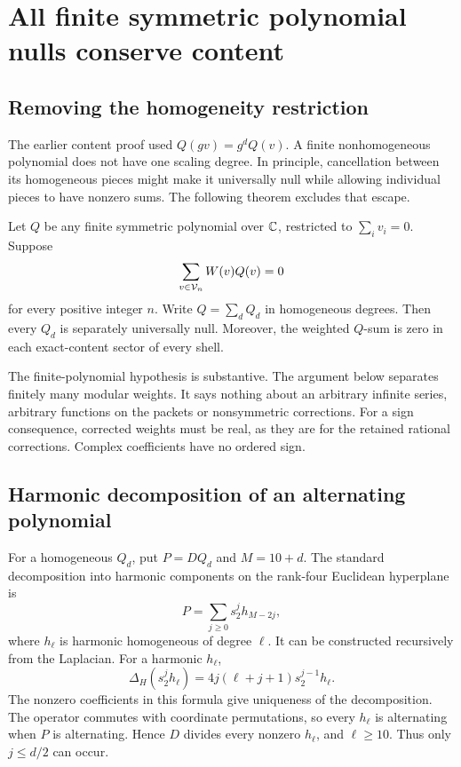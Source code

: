 \chapter{All finite symmetric polynomial nulls conserve content}\label{ch:pcall}
\section{Removing the homogeneity restriction}
The earlier content proof used $Q(gv)=g^dQ(v)$. A finite nonhomogeneous polynomial does not have one scaling degree. In principle, cancellation between its homogeneous pieces might make it universally null while allowing individual pieces to have nonzero sums. The following theorem excludes that escape.

\begin{theorem}\label{thm:pcall}
Let $Q$ be any finite symmetric polynomial over $\mathbb C$, restricted to $\sum_i v_i=0$. Suppose
\[
\sum_{v\in\mathcal V_n}W(v)Q(v)=0
\]
for every positive integer $n$. Write $Q=\sum_dQ_d$ in homogeneous degrees. Then every $Q_d$ is separately universally null. Moreover, the weighted $Q$-sum is zero in each exact-content sector of every shell.
\end{theorem}

The finite-polynomial hypothesis is substantive. The argument below separates finitely many modular weights. It says nothing about an arbitrary infinite series, arbitrary functions on the packets or nonsymmetric corrections. For a sign consequence, corrected weights must be real, as they are for the retained rational corrections. Complex coefficients have no ordered sign.

\section{Harmonic decomposition of an alternating polynomial}
For a homogeneous $Q_d$, put $P=DQ_d$ and $M=10+d$. The standard decomposition into harmonic components on the rank-four Euclidean hyperplane is
\begin{equation}\label{eq:harmdecomp}
P=\sum_{j\ge0}s_2^jh_{M-2j},
\end{equation}
where $h_\ell$ is harmonic homogeneous of degree $\ell$. It can be constructed recursively from the Laplacian. For a harmonic $h_\ell$,
\begin{equation}\label{eq:radiallap}
\Delta_H(s_2^jh_\ell)=4j(\ell+j+1)s_2^{j-1}h_\ell.
\end{equation}
The nonzero coefficients in this formula give uniqueness of the decomposition. The operator commutes with coordinate permutations, so every $h_\ell$ is alternating when $P$ is alternating. Hence $D$ divides every nonzero $h_\ell$, and $\ell\ge10$. Thus only $j\le d/2$ can occur.

